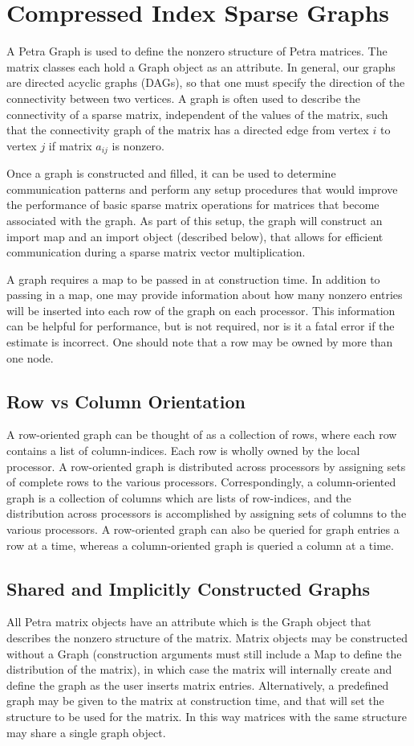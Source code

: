\documentclass[12pt,relax]{PetraObjectModel}
\begin{document}
\section{Compressed Index Sparse Graphs}
A Petra Graph is used to define the nonzero structure of Petra matrices. The
matrix classes each hold a Graph object as an attribute.
In general, our graphs are directed acyclic graphs (DAGs), so that one must
specify the direction of the connectivity between two vertices.  A graph is
often used to describe the connectivity of a sparse matrix, independent of
the values of the matrix, such that the connectivity graph of the matrix has
a directed edge from vertex $i$ to vertex $j$ if matrix $a_{ij}$ is nonzero.

Once a graph is constructed and filled, it can be used to determine
communication patterns and perform any setup procedures that would improve
the performance of basic sparse matrix operations for matrices that become
associated with the graph.  As part of this setup, the graph will construct
an import map and an import object (described below), that allows for
efficient communication during a sparse matrix vector multiplication.

A graph requires a map to be passed in at construction time.
In addition to passing in a map, one may provide
information about how many nonzero entries will be inserted into each row 
of the graph on each processor.  This information can be helpful for
performance, but is not required, nor is it a fatal error if the estimate
is incorrect.  One should note that a row may be owned by more than one node.

\subsection{Row vs Column Orientation}
A row-oriented graph can be thought of as a collection of rows, where each row
contains a list of column-indices. Each row is wholly owned by the local
processor. A row-oriented graph is distributed across processors by assigning
sets of complete rows to the various processors. Correspondingly, a
column-oriented graph is a collection of columns which are lists of row-indices,
and the distribution across processors is accomplished by assigning sets of
columns to the various processors.
A row-oriented graph can also be queried for graph entries a row at a time,
whereas a column-oriented graph is queried a column at a time.

\subsection{Shared and Implicitly Constructed Graphs}
All Petra matrix objects have an attribute which is the Graph object that
describes the nonzero structure of the matrix. Matrix objects may be constructed
without a Graph (construction arguments must still include a Map to define the
distribution of the matrix), in which case the matrix will internally create
and define the graph as the user inserts matrix entries. Alternatively, a
predefined graph
may be given to the matrix at construction time, and that will set the
structure to be used for the matrix. In this way matrices with the same
structure may share a single graph object.
\end{document}
